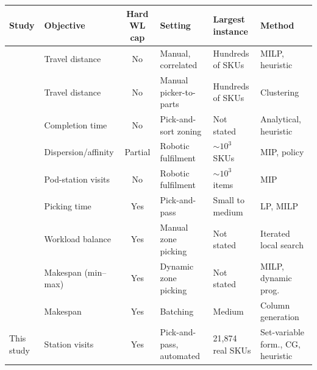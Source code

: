\documentclass[]{interact}
\begin{document}
\begin{table}[H]
\centering
{}
{\footnotesize\setlength{\tabcolsep}{3pt}
\begin{tabularx}{\textwidth}{@{}l X c X X >{\raggedright\arraybackslash}p{2.8cm}@{}}
\toprule
Study & Objective & Hard WL cap & Setting & Largest instance & Method \\
\midrule
\citet{zhang2019cie}        & Travel distance       & No    & Manual, correlated      & Hundreds of SKUs & MILP, heuristic \\
\citet{wang2020}            & Travel distance       & No    & Manual picker-to-parts  & Hundreds of SKUs & Clustering \\
\citet{dekoster2012zones}   & Completion time       & No    & Pick-and-sort zoning    & Not stated & Analytical, heuristic \\
\citet{mirzaei2021}         & Dispersion/affinity   & Partial & Robotic fulfilment   & $\sim 10^3$ SKUs & MIP, policy \\
\citet{xie2021}             & Pod-station visits    & No    & Robotic fulfilment      & $\sim 10^3$ items & MIP \\
\citet{tarczynski2023}      & Picking time          & Yes   & Pick-and-pass           & Small to medium & LP, MILP \\
\citet{vanheusden2022workload} & Workload balance    & Yes   & Manual zone picking   & Not stated & Iterated local search \\
\citet{saylam2023minmax}    & Makespan (min--max)   & Yes   & Dynamic zone picking    & Not stated & MILP, dynamic prog. \\
\citet{muter2022}           & Makespan              & Yes   & Batching        & Medium & Column generation \\
This study                  & Station visits        & Yes   & Pick-and-pass, automated & 21,874 real SKUs & Set-variable form., CG, heuristic \\
\bottomrule
\end{tabularx}}
\label{tab:litreview}
\end{table}



\end{document}
